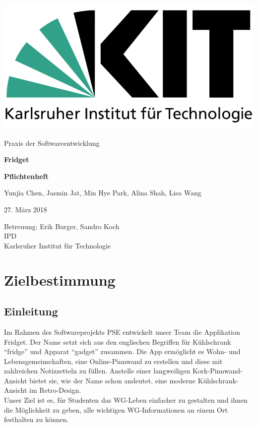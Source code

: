 \documentclass[a4paper]{scrreprt}
\begin{document}
    \begin{flushright}
        \includegraphics[scale = 0.2]{kit-logo.png}\\[0.5cm]
    \end{flushright}
    \vspace*{2cm}

    \begin{center} 
    		\large Praxis der Softwareentwicklung
        \vspace*{1.5cm}

        \textbf{\huge Fridget}
        \vspace*{1cm}

        \textbf{\Large Pflichtenheft}
        \vspace*{2cm}

        Yunjia Chen, Jasmin Jat, Min Hye Park, Alina Shah, Lisa Wang
        \vspace*{1cm}

        27. März 2018
        \vspace*{2.5cm}

        Betreuung: Erik Burger, Sandro Koch\\[0.5cm]
        IPD\\[0.5cm]

        Karlsruher Institut für Technologie
    \end{center}
    \thispagestyle{empty}

    \tableofcontents

    \chapter{Zielbestimmung}
    
    	\section{Einleitung}
    	Im Rahmen des Softwareprojekts PSE entwickelt unser Team die Applikation Fridget. Der Name setzt sich aus den englischen Begriffen für Kühlschrank ``fridge” und Apparat ``gadget” zusammen. Die App ermöglicht es Wohn- und Lebensgemeinschaften, eine Online-Pinnwand zu erstellen und diese mit zahlreichen Notizzetteln zu füllen. Anstelle einer langweiligen Kork-Pinnwand-Ansicht bietet sie, wie der Name schon andeutet, eine moderne Kühlschrank-Ansicht im Retro-Design.\\
    	Unser Ziel ist es, für Studenten das WG-Leben einfacher zu gestalten und ihnen die Möglichkeit zu geben, alle wichtigen WG-Informationen an einem Ort festhalten zu können.
    	
\end{document}
